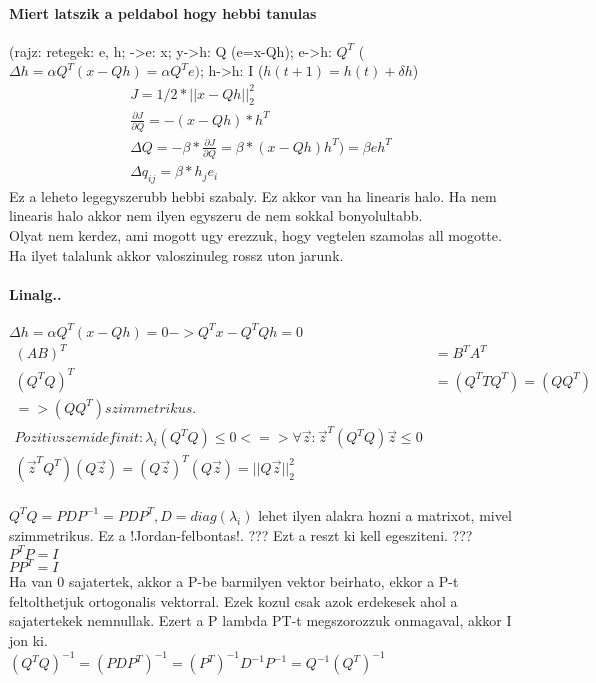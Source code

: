 \documentclass[10pt,a4paper]{report}
\begin{document}
\paragraph{Miert latszik a peldabol hogy hebbi tanulas}
(rajz: retegek: e, h; ->e: x; y->h: Q (e=x-Qh); e->h: $Q^T$ ($\Delta h = \alpha Q^T(x-Qh) = \alpha Q^T e)$; h->h: I ($h(t+1) = h(t) + \delta h$)\\
\begin{align}
J=1/2*||x-Qh||_2^2 \\
\frac{\partial J}{\partial Q} = -(x-Qh)*h^T \\
\Delta Q = -\beta * \frac{\partial J}{\partial Q} = \beta * (x-Qh)h^T) = \beta e h^T\\
\Delta q_{ij} = \beta * h_j e_i
\end{align}
Ez a leheto legegyszerubb hebbi szabaly. Ez akkor van ha linearis halo. Ha nem linearis halo akkor nem ilyen egyszeru de nem sokkal bonyolultabb.\\
Olyat nem kerdez, ami mogott ugy erezzuk, hogy vegtelen szamolas all mogotte. Ha ilyet talalunk akkor valoszinuleg rossz uton jarunk.\\
\paragraph{Linalg..}
$\Delta h = \alpha Q^T(x-Qh) = 0 -> Q^Tx - Q^TQh = 0$ \\
\begin{align}
(AB)^T &= B^T A^T\\
(Q^TQ)^T &= (Q^TTQ^T) = (QQ^T)\\
=> (QQ^T) szimmetrikus.\\
Pozitiv szemidefinit: \lambda_i (Q^TQ)\leq 0 <=> \forall \vec{z}: \vec{z}^T(Q^TQ) \vec{z} \leq 0\\
(\vec{z}^TQ^T)(Q\vec{z}) = (Q\vec{z})^T(Q\vec{z}) = ||Q\vec{z}||_2^2\\
\end{align} 

$Q^TQ = PDP^{-1} = PDP^T, D=diag(\lambda_i)$ %
lehet ilyen alakra hozni a matrixot, mivel szimmetrikus. Ez a !Jordan-felbontas!. ??? Ezt a reszt ki kell egesziteni. ???
$P^TP=I$\\
$PP^T=I$\\
Ha van 0 sajatertek, akkor a P-be barmilyen vektor beirhato, ekkor a P-t feltolthetjuk ortogonalis vektorral. Ezek kozul csak azok erdekesek ahol a sajatertekek nemnullak. Ezert a P lambda PT-t megszorozzuk onmagaval, akkor I jon ki. \\
$(Q^TQ)^{-1} = (PDP^T)^{-1} = (P^T)^{-1}D^{-1}P^{-1} = Q^{-1}(Q^T)^{-1}$\\
\end{document}
